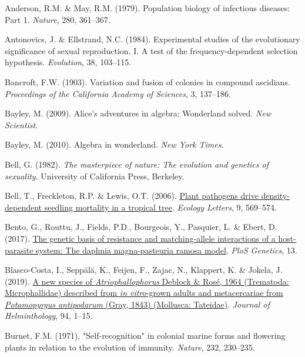 \documentclass[
  letterpaper,
]{book}
\newlength{\cslhangindent}
\newenvironment{CSLReferences}[2] %
 {\begin{list}{}{%
  \setlength{\itemindent}{0pt}
  \setlength{\leftmargin}{0pt}
  \setlength{\parsep}{0pt}
  \ifodd #1
   \setlength{\leftmargin}{\cslhangindent}
   \setlength{\itemindent}{-1\cslhangindent}
  \fi
  \setlength{\itemsep}{#2\baselineskip}}}
 {\end{list}}
\begin{document}
\label{refs}
\begin{CSLReferences}{1}{0}
Anderson, R.M. \& May, R.M. (1979). Population biology of infectious
diseases: Part 1. \emph{Nature}, 280, 361--367.

Antonovics, J. \& Ellstrand, N.C. (1984). Experimental studies of the
evolutionary significance of sexual reproduction. I. A test of the
frequency-dependent selection hypothesis. \emph{Evolution}, 38,
103--115.

Bancroft, F.W. (1903). Variation and fusion of colonies in compound
ascidians. \emph{Proceedings of the {California Academy of Sciences}},
3, 137--186.

Bayley, M. (2009). Alice's adventures in algebra: Wonderland solved.
\emph{New Scientist}.

Bayley, M. (2010). Algebra in wonderland. \emph{New York Times}.

Bell, G. (1982). \emph{The masterpiece of nature: The evolution and
genetics of sexuality}. University of California Press, Berkeley.

Bell, T., Freckleton, R.P. \& Lewis, O.T. (2006).
\href{https://doi.org/10.1111/j.1461-0248.2006.00905.x}{Plant pathogens
drive density-dependent seedling mortality in a tropical tree}.
\emph{Ecology Letters}, 9, 569--574.

Bento, G., Routtu, J., Fields, P.D., Bourgeois, Y., Pasquier, L. \&
Ebert, D. (2017).
\href{https://doi.org/10.1371/journal.pgen.1006596}{The genetic basis of
resistance and matching-allele interactions of a host-parasite system:
The daphnia magna-pasteuria ramosa model}. \emph{PloS Genetics}, 13.

Blasco-Costa, I., Seppälä, K., Feijen, F., Zajac, N., Klappert, K. \&
Jokela, J. (2019). \href{https://doi.org/10.1017/S0022149X19000993}{A
new species of \emph{{A}triophallophorus} {Deblock \& Rosé}, 1964
({Trematoda: Microphallidae}) described from \emph{in vitro}-grown
adults and metacercariae from \emph{{P}otamopyrgus antipodarum} ({G}ray,
1843) ({Mollusca: Tateidae})}. \emph{Journal of Helminthology}, 94,
1--15.

Burnet, F.M. (1971). "Self-recognition" in colonial marine forms and
flowering plants in relation to the evolution of immunity.
\emph{Nature}, 232, 230--235.


\end{CSLReferences}
\end{document}
